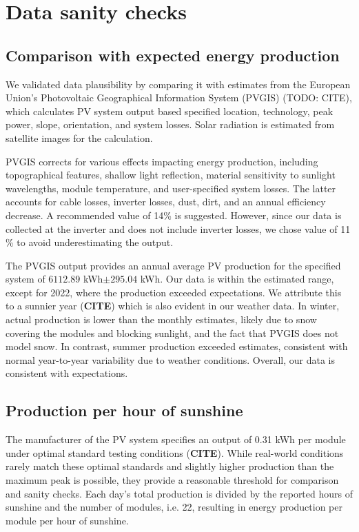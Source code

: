 \documentclass{article}
\begin{document}
\section{Data sanity checks}\label{sec:methods}

\subsection{Comparison with expected energy production}

We validated data plausibility by comparing it with estimates from the European Union's Photovoltaic Geographical Information System (PVGIS) (TODO: CITE), which calculates PV system output based specified location, technology, peak power, slope, orientation, and system losses. Solar radiation is estimated from satellite images for the calculation.

PVGIS corrects for various effects impacting energy production, including topographical features, shallow light reflection, material sensitivity to sunlight wavelengths, module temperature, and user-specified system losses. The latter accounts for cable losses, inverter losses, dust, dirt, and an annual efficiency decrease. A recommended value of 14\% is suggested. However, since our data is collected at the inverter and does not include inverter losses, we chose value of 11 \% to avoid underestimating the output.

The PVGIS output provides an annual average PV production for the specified system of $6112.89$ kWh$ \pm 295.04$ kWh. Our data is within the estimated range, except for 2022, where the production exceeded expectations. We attribute this to a sunnier year (\textbf{CITE}) which is also evident in our weather data. In winter, actual production is lower than the monthly estimates, likely due to snow covering the modules and blocking sunlight, and the fact that PVGIS does not model snow. In contrast, summer production exceeded estimates, consistent with normal year-to-year variability due to weather conditions. Overall, our data is consistent with expectations.

\subsection{Production per hour of sunshine}

The manufacturer of the PV system specifies an output of 0.31 kWh per module under optimal standard testing conditions (\textbf{CITE}). While real-world conditions rarely match these optimal standards and slightly higher production than the maximum peak is possible, they provide a reasonable threshold for comparison and sanity checks. Each day's total production is divided by the reported hours of sunshine and the number of modules, i.e. 22, resulting in energy production per module per hour of sunshine.
\end{document}
